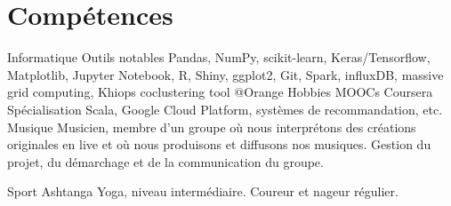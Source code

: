 \documentclass[]{friggeri-cv}
\begin{document}
\vspace{-1.1em}


\section{Compétences}

\begin{entrylist}
  \entry
    {Informatique}
    {Outils notables}
    {}
    {Pandas, NumPy, scikit-learn, Keras/Tensorflow, Matplotlib, Jupyter Notebook, R, Shiny, ggplot2, Git, Spark, influxDB, massive grid computing, Khiops coclustering tool @Orange}
  \entry
    {Hobbies}
    {MOOCs Coursera}
    {}
    {Spécialisation Scala, Google Cloud Platform, systèmes de recommandation, etc.}
    \entry
    {}
    {Musique}
    {}
    {Musicien, membre d’un groupe où nous interprétons des créations originales en live et où nous produisons et diffusons nos musiques. Gestion du projet, du démarchage et de la communication du groupe.
    }

  \entry
    {}
    {Sport}
    {}
    {Ashtanga Yoga, niveau intermédiaire. Coureur et nageur régulier.}
\end{entrylist}
\end{document}
